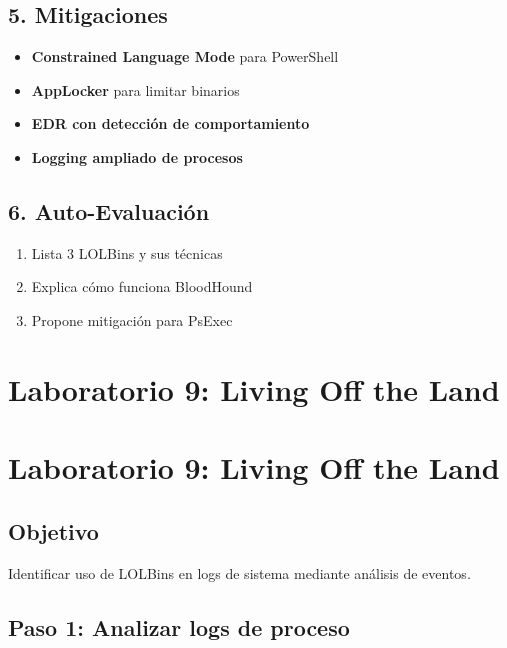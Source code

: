 \documentclass[
  letterpaper,
]{report}
\providecommand{\tightlist}{%
  \setlength{\itemsep}{0pt}\setlength{\parskip}{0pt}}
\begin{document}
\section{5. Mitigaciones}\label{mitigaciones-1}

\begin{itemize}
\tightlist
\item
  \textbf{Constrained Language Mode} para PowerShell
\item
  \textbf{AppLocker} para limitar binarios
\item
  \textbf{EDR con detección de comportamiento}
\item
  \textbf{Logging ampliado de procesos}
\end{itemize}

\section{6. Auto-Evaluación}\label{auto-evaluaciuxf3n-8}

\begin{enumerate}
\def\labelenumi{\arabic{enumi}.}
\tightlist
\item
  Lista 3 LOLBins y sus técnicas
\item
  Explica cómo funciona BloodHound
\item
  Propone mitigación para PsExec
\end{enumerate}

\chapter{Laboratorio 9: Living Off the
Land}\label{laboratorio-9-living-off-the-land}

\chapter{Laboratorio 9: Living Off the
Land}\label{laboratorio-9-living-off-the-land-1}

\section{Objetivo}\label{objetivo-8}

Identificar uso de LOLBins en logs de sistema mediante análisis de
eventos.

\section{Paso 1: Analizar logs de
proceso}\label{paso-1-analizar-logs-de-proceso}
\end{document}
